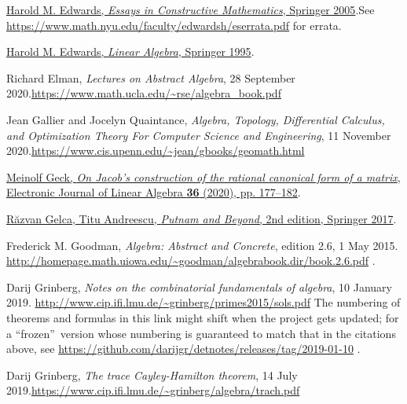 \documentclass[numbers=enddot,12pt,final,onecolumn,notitlepage]{scrartcl}%
\numberwithin{exer}{subsection}
\theoremstyle{definition}
\begin{document}
\begin{thebibliography}{99999999}
%
\href{https://doi.org/10.1007/b138656}{Harold M. Edwards, \textit{Essays in
Constructive Mathematics}, Springer 2005}.\newline See
\url{https://www.math.nyu.edu/faculty/edwardsh/eserrata.pdf} for errata.

%
\href{https://doi.org/10.1007/978-0-8176-4446-8}{Harold M. Edwards,
\textit{Linear Algebra}, Springer 1995}.

Richard Elman, \textit{Lectures on Abstract
Algebra}, 28 September 2020.\newline\url{https://www.math.ucla.edu/~rse/algebra_book.pdf}

Jean Gallier and Jocelyn Quaintance,
\textit{Algebra, Topology, Differential Calculus, and Optimization Theory For
Computer Science and Engineering}, 11 November 2020.\newline\url{https://www.cis.upenn.edu/~jean/gbooks/geomath.html}

\href{https://doi.org/10.13001/ela.2020.5055}{Meinolf
Geck, \textit{On Jacob's construction of the rational canonical form of a
matrix}, Electronic Journal of Linear Algebra \textbf{36} (2020), pp.
177--182}.

%
\href{https://doi.org/10.1007/978-3-319-58988-6}{R\u{a}zvan Gelca, Titu
Andreescu, \textit{Putnam and Beyond}, 2nd edition, Springer 2017}.

Frederick M. Goodman, \textit{Algebra: Abstract and
Concrete}, edition 2.6, 1 May 2015.\newline%
\url{http://homepage.math.uiowa.edu/~goodman/algebrabook.dir/book.2.6.pdf} .

Darij Grinberg, \textit{Notes on the combinatorial
fundamentals of algebra}, 10 January 2019.\newline%
\url{http://www.cip.ifi.lmu.de/~grinberg/primes2015/sols.pdf} \newline The
numbering of theorems and formulas in this link might shift when the project
gets updated; for a \textquotedblleft frozen\textquotedblright\ version whose
numbering is guaranteed to match that in the citations above, see
\url{https://github.com/darijgr/detnotes/releases/tag/2019-01-10} .

Darij Grinberg, \textit{The trace Cayley-Hamilton
theorem}, 14 July 2019.\newline\url{https://www.cip.ifi.lmu.de/~grinberg/algebra/trach.pdf}


\end{thebibliography}
\end{document}
